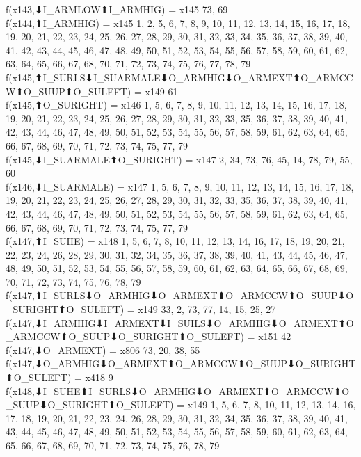 f(x143,⬇I_ARMLOW⬆I_ARMHIG) = x145 {73, 69} \\
f(x144,⬆I_ARMHIG) = x145 {1, 2, 5, 6, 7, 8, 9, 10, 11, 12, 13, 14, 15, 16, 17, 18, 19, 20, 21, 22, 23, 24, 25, 26, 27, 28, 29, 30, 31, 32, 33, 34, 35, 36, 37, 38, 39, 40, 41, 42, 43, 44, 45, 46, 47, 48, 49, 50, 51, 52, 53, 54, 55, 56, 57, 58, 59, 60, 61, 62, 63, 64, 65, 66, 67, 68, 70, 71, 72, 73, 74, 75, 76, 77, 78, 79} \\
f(x145,⬆I_SURLS⬇I_SUARMALE⬇O_ARMHIG⬇O_ARMEXT⬆O_ARMCCW⬆O_SUUP⬆O_SULEFT) = x149 {61} \\
f(x145,⬆O_SURIGHT) = x146 {1, 5, 6, 7, 8, 9, 10, 11, 12, 13, 14, 15, 16, 17, 18, 19, 20, 21, 22, 23, 24, 25, 26, 27, 28, 29, 30, 31, 32, 33, 35, 36, 37, 38, 39, 40, 41, 42, 43, 44, 46, 47, 48, 49, 50, 51, 52, 53, 54, 55, 56, 57, 58, 59, 61, 62, 63, 64, 65, 66, 67, 68, 69, 70, 71, 72, 73, 74, 75, 77, 79} \\
f(x145,⬇I_SUARMALE⬆O_SURIGHT) = x147 {2, 34, 73, 76, 45, 14, 78, 79, 55, 60} \\
f(x146,⬇I_SUARMALE) = x147 {1, 5, 6, 7, 8, 9, 10, 11, 12, 13, 14, 15, 16, 17, 18, 19, 20, 21, 22, 23, 24, 25, 26, 27, 28, 29, 30, 31, 32, 33, 35, 36, 37, 38, 39, 40, 41, 42, 43, 44, 46, 47, 48, 49, 50, 51, 52, 53, 54, 55, 56, 57, 58, 59, 61, 62, 63, 64, 65, 66, 67, 68, 69, 70, 71, 72, 73, 74, 75, 77, 79} \\
f(x147,⬆I_SUHE) = x148 {1, 5, 6, 7, 8, 10, 11, 12, 13, 14, 16, 17, 18, 19, 20, 21, 22, 23, 24, 26, 28, 29, 30, 31, 32, 34, 35, 36, 37, 38, 39, 40, 41, 43, 44, 45, 46, 47, 48, 49, 50, 51, 52, 53, 54, 55, 56, 57, 58, 59, 60, 61, 62, 63, 64, 65, 66, 67, 68, 69, 70, 71, 72, 73, 74, 75, 76, 78, 79} \\
f(x147,⬆I_SURLS⬇O_ARMHIG⬇O_ARMEXT⬆O_ARMCCW⬆O_SUUP⬇O_SURIGHT⬆O_SULEFT) = x149 {33, 2, 73, 77, 14, 15, 25, 27} \\
f(x147,⬇I_ARMHIG⬇I_ARMEXT⬇I_SUILS⬇O_ARMHIG⬇O_ARMEXT⬆O_ARMCCW⬆O_SUUP⬇O_SURIGHT⬆O_SULEFT) = x151 {42} \\
f(x147,⬇O_ARMEXT) = x806 {73, 20, 38, 55} \\
f(x147,⬇O_ARMHIG⬇O_ARMEXT⬆O_ARMCCW⬆O_SUUP⬇O_SURIGHT⬆O_SULEFT) = x418 {9} \\
f(x148,⬇I_SUHE⬆I_SURLS⬇O_ARMHIG⬇O_ARMEXT⬆O_ARMCCW⬆O_SUUP⬇O_SURIGHT⬆O_SULEFT) = x149 {1, 5, 6, 7, 8, 10, 11, 12, 13, 14, 16, 17, 18, 19, 20, 21, 22, 23, 24, 26, 28, 29, 30, 31, 32, 34, 35, 36, 37, 38, 39, 40, 41, 43, 44, 45, 46, 47, 48, 49, 50, 51, 52, 53, 54, 55, 56, 57, 58, 59, 60, 61, 62, 63, 64, 65, 66, 67, 68, 69, 70, 71, 72, 73, 74, 75, 76, 78, 79} \\
